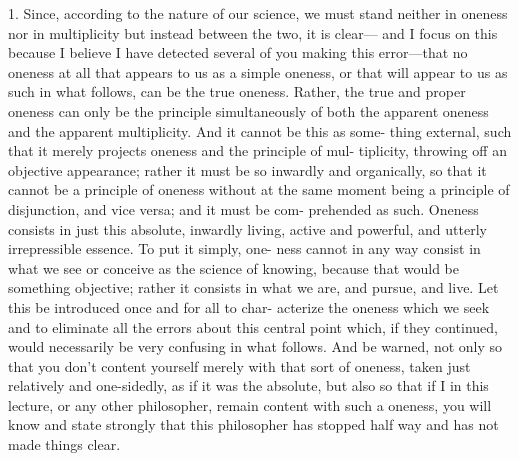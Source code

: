 1. Since, according to the nature of our science, we must stand
neither in oneness nor in multiplicity but instead between the two, it is clear—
and I focus on this because I believe I have detected several of you making this
error—that no oneness at all that appears to us as a simple oneness, or that
will appear to us as such in what follows, can be the true oneness.
Rather, the
true and proper oneness can only be the principle simultaneously of both the
apparent oneness and the apparent multiplicity.
And it cannot be this as some-
thing external, such that it merely projects oneness and the principle of mul-
tiplicity, throwing off an objective appearance; rather it must be so inwardly
and organically, so that it cannot be a principle of oneness without at the same
moment being a principle of disjunction, and vice versa; and it must be com-
prehended as such.
Oneness consists in just this absolute, inwardly living,
active and powerful, and utterly irrepressible essence.
To put it simply, one-
ness cannot in any way consist in what we see or conceive as the science of
knowing, because that would be something objective; rather it consists in what
we are, and pursue, and live.
Let this be introduced once and for all to char-
acterize the oneness which we seek and to eliminate all the errors about this
central point which, if they continued, would necessarily be very confusing in
what follows.
And be warned, not only so that you don’t content yourself
merely with that sort of oneness, taken just relatively and one-sidedly, as if it
was the absolute, but also so that if I in this lecture, or any other philosopher,
remain content with such a oneness, you will know and state strongly that this
philosopher has stopped half way and has not made things clear.

